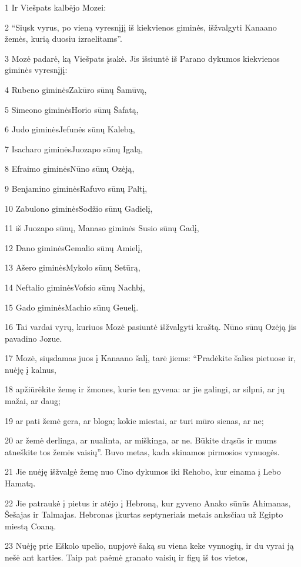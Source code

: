 \par 1 Ir Viešpats kalbėjo Mozei: 
\par 2 “Siųsk vyrus, po vieną vyresnįjį iš kiekvienos giminės, išžvalgyti Kanaano žemės, kurią duosiu izraelitams”. 
\par 3 Mozė padarė, ką Viešpats įsakė. Jis išsiuntė iš Parano dykumos kiekvienos giminės vyresnįjį: 
\par 4 Rubeno giminės­Zakūro sūnų Šamūvą, 
\par 5 Simeono giminės­Horio sūnų Šafatą, 
\par 6 Judo giminės­Jefunės sūnų Kalebą, 
\par 7 Isacharo giminės­Juozapo sūnų Igalą, 
\par 8 Efraimo giminės­Nūno sūnų Ozėją, 
\par 9 Benjamino giminės­Rafuvo sūnų Paltį, 
\par 10 Zabulono giminės­Sodžio sūnų Gadielį, 
\par 11 iš Juozapo sūnų, Manaso giminės­ Susio sūnų Gadį, 
\par 12 Dano giminės­Gemalio sūnų Amielį, 
\par 13 Ašero giminės­Mykolo sūnų Setūrą, 
\par 14 Neftalio giminės­Vofsio sūnų Nachbį, 
\par 15 Gado giminės­Machio sūnų Geuelį. 
\par 16 Tai vardai vyrų, kuriuos Mozė pasiuntė išžvalgyti kraštą. Nūno sūnų Ozėją jis pavadino Jozue. 
\par 17 Mozė, siųsdamas juos į Kanaano šalį, tarė jiems: “Pradėkite šalies pietuose ir, nuėję į kalnus, 
\par 18 apžiūrėkite žemę ir žmones, kurie ten gyvena: ar jie galingi, ar silpni, ar jų mažai, ar daug; 
\par 19 ar pati žemė gera, ar bloga; kokie miestai, ar turi mūro sienas, ar ne; 
\par 20 ar žemė derlinga, ar nualinta, ar miškinga, ar ne. Būkite drąsūs ir mums atneškite tos žemės vaisių”. Buvo metas, kada skinamos pirmosios vynuogės. 
\par 21 Jie nuėję išžvalgė žemę nuo Cino dykumos iki Rehobo, kur einama į Lebo Hamatą. 
\par 22 Jie patraukė į pietus ir atėjo į Hebroną, kur gyveno Anako sūnūs Ahimanas, Šešajas ir Talmajas. Hebronas įkurtas septyneriais metais anksčiau už Egipto miestą Coaną. 
\par 23 Nuėję prie Eškolo upelio, nupjovė šaką su viena keke vynuogių, ir du vyrai ją nešė ant karties. Taip pat paėmė granato vaisių ir figų iš tos vietos, 
